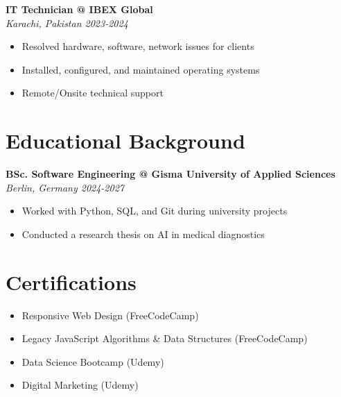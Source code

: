 \documentclass[res,12pt]{article}
\begin{document}
\begin{paracol}{2}
\begin{rightcolumn}
\begin{minipage}{\linewidth}
\textbf{IT Technician @ IBEX Global}\\[0.3em]
\textit {Karachi, Pakistan \hfill2023-2024}
\begin{itemize}[itemindent=-1.5em, label=-]
  \item Resolved hardware, software, network issues for clients
  \item Installed, configured, and maintained operating systems
  \item Remote/Onsite technical support
\end{itemize}

\section*{Educational Background}

\textbf{BSc. Software Engineering @ Gisma University of Applied Sciences}\\[0.3em]
\textit {Berlin, Germany \hfill 2024-2027}
\begin{itemize}[itemindent=-1.5em, label=-]
  \item Worked with Python, SQL, and Git during university projects
  \item Conducted a research thesis on AI in medical diagnostics
\end{itemize}

\section*{Certifications}

\begin{itemize}[label=-, leftmargin=*, itemsep=0.4em, align=parleft]
  \item Responsive Web Design (FreeCodeCamp)
  \item Legacy JavaScript Algorithms \& Data Structures (FreeCodeCamp)
  \item Data Science Bootcamp (Udemy)
  \item Digital Marketing (Udemy)
\end{itemize}


\end{minipage}
\end{rightcolumn}

\end{paracol}
\end{document}
